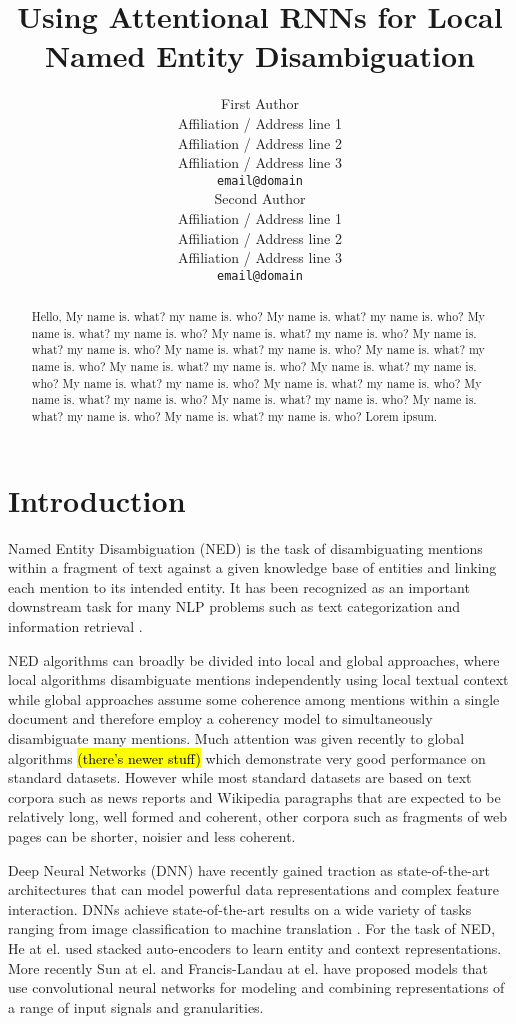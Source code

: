 \documentclass[11pt]{article}
\title{Using Attentional RNNs for Local Named Entity Disambiguation}
\author{First Author \\
	Affiliation / Address line 1 \\
	Affiliation / Address line 2 \\
	Affiliation / Address line 3 \\
	{\tt email@domain} \\\And
	Second Author \\
	Affiliation / Address line 1 \\
	Affiliation / Address line 2 \\
	Affiliation / Address line 3 \\
	{\tt email@domain} \\}
\date{}
\begin{document}
	\maketitle
	\begin{abstract}
		Hello, My name is. what? my name is. who?
		My name is. what? my name is. who?
		My name is. what? my name is. who?
		My name is. what? my name is. who?
		My name is. what? my name is. who?
		My name is. what? my name is. who?
		My name is. what? my name is. who?
		My name is. what? my name is. who?
		My name is. what? my name is. who?
		My name is. what? my name is. who?
		My name is. what? my name is. who?
		My name is. what? my name is. who?
		My name is. what? my name is. who?
		My name is. what? my name is. who?
		My name is. what? my name is. who? Lorem ipsum.
	\end{abstract}
	
	\section{Introduction}
	
	Named Entity Disambiguation (NED) is the task of disambiguating mentions within a fragment of text against a given knowledge base of entities and linking each mention to its intended entity. It has been recognized as an important downstream task for many NLP problems such as text categorization \cite{gabrilovich2007computing} and information retrieval \cite{dalton2014entity}. 
	
	NED algorithms can broadly be divided into local and global approaches, where local algorithms disambiguate mentions independently using local textual context while global approaches assume some coherence among mentions within a single document and therefore employ a coherency model to simultaneously disambiguate many mentions. Much attention was given recently to global algorithms \cite{ratinov2011local,guo2014entity,pershina2015personalized} \hl{(there's newer stuff)} which demonstrate very good performance on standard datasets. However while most standard datasets are based on text corpora such as news reports and Wikipedia paragraphs that are expected to be relatively long, well formed and coherent, other corpora such as fragments of web pages can be shorter, noisier and less coherent.
	
	Deep Neural Networks (DNN) have recently gained traction as state-of-the-art architectures that can model powerful data representations and complex feature interaction. DNNs achieve state-of-the-art results on a wide variety of tasks ranging from image classification \cite{krizhevsky2012imagenet} to machine translation \cite{bahdanau2014neural}. For the task of NED, He at el. \cite{he2013learning} used stacked auto-encoders to learn entity and context representations. More recently Sun at el. and Francis-Landau at el. \cite{sun2015modeling,francis2016capturing} have proposed models that use convolutional neural networks for modeling and combining representations of a range of input signals and granularities. 
	
\end{document}
